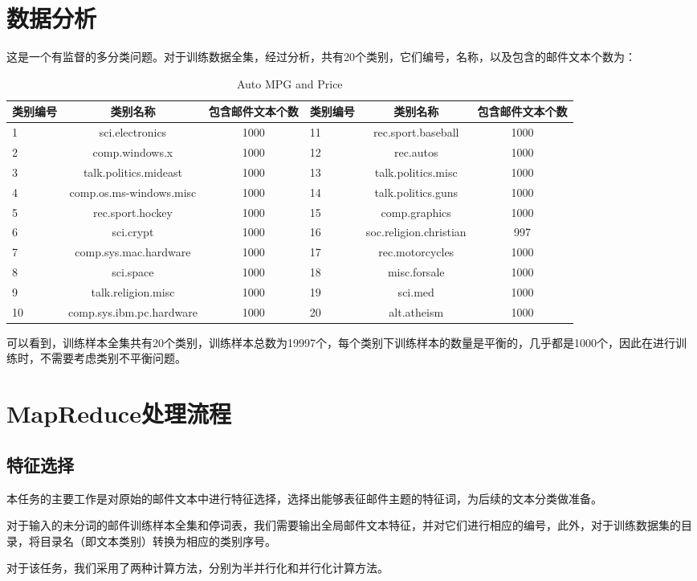 \documentclass[lang=cn,11pt]{elegantpaper}
\begin{document}
\begin{lstlisting}

\end{lstlisting}

\section{数据分析}
这是一个有监督的多分类问题。对于训练数据全集，经过分析，共有20个类别，它们编号，名称，以及包含的邮件文本个数为：\par
\begin{table}[!htbp]
  \small
  \centering
  \caption{Auto MPG and Price \label{tab:reg}}
    \begin{tabular}{lcc|lcc}
    \toprule
    类别编号  &   类别名称  &   包含邮件文本个数  &   类别编号  & 类别名称  & 包含邮件文本个数  \\
    \hline
    1 & sci.electronics & 1000            & 11 & rec.sport.baseball & 1000 \\
    2 & comp.windows.x & 1000             & 12 & rec.autos & 1000 \\
    3 & talk.politics.mideast & 1000      & 13 & talk.politics.misc & 1000 \\
    4 & comp.os.ms-windows.misc & 1000    & 14 & talk.politics.guns & 1000 \\
    5 & rec.sport.hockey & 1000           & 15 & comp.graphics & 1000 \\
    6 & sci.crypt & 1000                  & 16 & soc.religion.christian & 997 \\
    7 & comp.sys.mac.hardware & 1000      & 17 & rec.motorcycles & 1000 \\
    8 & sci.space & 1000                  & 18 & misc.forsale & 1000 \\
    9 & talk.religion.misc & 1000         & 19 & sci.med & 1000 \\
    10 & comp.sys.ibm.pc.hardware & 1000  & 20 & alt.atheism & 1000 \\
    \bottomrule
    \end{tabular}%
\end{table}%
可以看到，训练样本全集共有20个类别，训练样本总数为19997个，每个类别下训练样本的数量是平衡的，几乎都是1000个，因此在进行训练时，不需要考虑类别不平衡问题。


\section{MapReduce处理流程}
\subsection{特征选择}
本任务的主要工作是对原始的邮件文本中进行特征选择，选择出能够表征邮件主题的特征词，为后续的文本分类做准备。\par
对于输入的未分词的邮件训练样本全集和停词表，我们需要输出全局邮件文本特征，并对它们进行相应的编号，此外，对于训练数据集的目录，将目录名（即文本类别）转换为相应的类别序号。\par
对于该任务，我们采用了两种计算方法，分别为半并行化和并行化计算方法。
\end{document}
